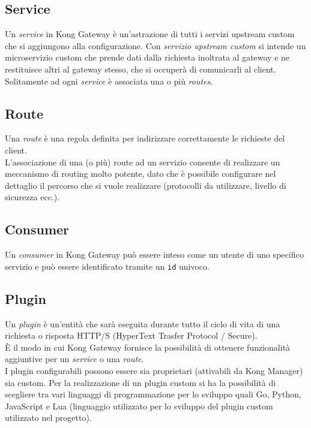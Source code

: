 \subsection{Service}\label{sec:kongservice}
Un \emph{service} in Kong Gateway è un'astrazione di tutti i servizi upstream custom che si aggiungono alla configurazione. Con \emph{servizio upstream custom} si intende un microservizio custom che prende dati dalla richiesta inoltrata al gateway e ne restituisce altri al gateway stesso, che si occuperà di comunicarli al client.\\
Solitamente ad ogni \emph{service} è associata una o più \emph{routes}. \cite{Kong}\\

\subsection{Route}\label{sec:kongroute}
Una \emph{route} è una regola definita per indirizzare correttamente le richieste del client.\\
L'associazione di una (o più) route ad un servizio consente di realizzare un meccanismo di routing molto potente, dato che è possibile configurare
 nel dettaglio il percorso che si vuole realizzare (protocolli da utilizzare, livello di sicurezza ecc.). \cite{Kong}\\

\subsection{Consumer}\label{sec:kongconsumer}
Un \emph{consumer} in Kong Gateway può essere inteso come un utente di uno specifico servizio e può essere identificato tramite un \texttt{id} univoco. \cite{Kong}

\subsection{Plugin}\label{sec:kongplugin}
Un \emph{plugin} è un'entità che sarà eseguita durante tutto il ciclo di vita di una richiesta o risposta HTTP/S (HyperText Trasfer Protocol / Secure).\\
È il modo in cui Kong Gateway fornisce la possibilità di ottenere funzionalità aggiuntive per un \emph{service} o una \emph{route}.\\
I plugin configurabili possono essere sia proprietari (attivabili da Kong Manager) sia custom. Per la realizzazione di un plugin custom si ha la possibilità 
di scegliere tra vari linguaggi di programmazione per lo sviluppo quali Go, Python, JavaScript e Lua (linguaggio utilizzato per lo sviluppo 
del plugin custom utilizzato nel progetto). \cite{Kong}\\ 

